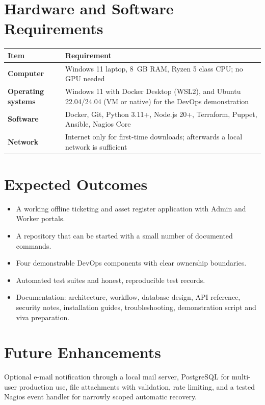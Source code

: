 \documentclass[12pt,a4paper]{article}
\begin{document}
\section{Hardware and Software Requirements}
\begin{center}
\begin{tabular}{@{}>{\bfseries}p{4cm}p{9.7cm}@{}}
\toprule
Item & Requirement\\
\midrule
Computer & Windows 11 laptop, 8~GB RAM, Ryzen 5 class CPU; no GPU needed\\
Operating systems & Windows 11 with Docker Desktop (WSL2), and Ubuntu 22.04/24.04 (VM or native) for the DevOps demonstration\\
Software & Docker, Git, Python 3.11+, Node.js 20+, Terraform, Puppet, Ansible, Nagios Core\\
Network & Internet only for first-time downloads; afterwards a local network is sufficient\\
\bottomrule
\end{tabular}
\end{center}

\section{Expected Outcomes}
\begin{itemize}[leftmargin=*]
  \item A working offline ticketing and asset register application with Admin and Worker portals.
  \item A repository that can be started with a small number of documented commands.
  \item Four demonstrable DevOps components with clear ownership boundaries.
  \item Automated test suites and honest, reproducible test records.
  \item Documentation: architecture, workflow, database design, API reference, security notes, installation guides, troubleshooting, demonstration script and viva preparation.
\end{itemize}

\section{Future Enhancements}
Optional e-mail notification through a local mail server, PostgreSQL for multi-user production use, file attachments with validation, rate limiting, and a tested Nagios event handler for narrowly scoped automatic recovery.
\end{document}
